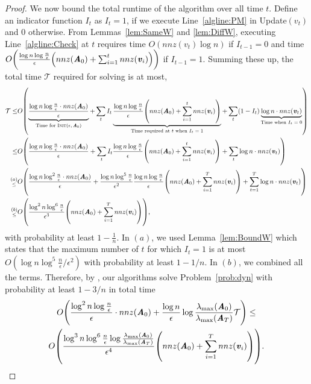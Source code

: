 \documentclass[11pt]{article}
\let\originalleft\left
\let\originalright\right
\renewcommand{\left}{\mathopen{}\mathclose\bgroup\originalleft}
\renewcommand{\right}{\aftergroup\egroup\originalright}
\newcommand\vv{\boldsymbol{\mathit{v}}}
\renewcommand\AA{\boldsymbol{\mathit{A}}}
\begin{document}
\begin{proof}
We now bound the total runtime of the algorithm over all time $t$. Define an indicator function $I_t$ as $I_t = 1$, if we execute Line~\ref{algline:PM} in {\sc Update}$(\vv_t)$ and $0$ otherwise. From Lemmas~\ref{lem:SameW} and \ref{lem:DiffW}, executing Line~\ref{algline:Check} at $t$ requires time $O(nnz(\vv_t)\log n)$ if $I_{t-1} = 0$ and time $O\left(\frac{\log n\log \frac{n}{\epsilon}}{\epsilon}\left(nnz(\AA_0) +\sum_{i=1}^t nnz(\vv_i)\right)\right)$ if $I_{t-1} = 1$. Summing these up, the total time $\mathcal{T}$ required for solving  is at most,
\begin{align*}
\mathcal{T} \leq &  O\left(\underbrace{\frac{\log n\log \frac{n}{\epsilon} \cdot nnz(\AA_0)}{\epsilon}}_{\text{Time for {\sc Init}($\epsilon,\AA_0$)}} + \sum_t I_t \underbrace{\frac{\log n\log \frac{n}{\epsilon}}{\epsilon}\left(nnz(\AA_0) +\sum_{i=1}^t nnz(\vv_i)\right)}_{\text{Time required at $t$ when $I_t = 1$}} + \sum_t (1-I_t)\underbrace{\log n \cdot nnz(\vv_t)}_{\text{Time when $I_t=0$}}\right)\\
\leq & O\left( \frac{\log n\log \frac{n}{\epsilon}\cdot nnz(\AA_0)}{\epsilon}+ \sum_t I_t \frac{\log n\log \frac{n}{\epsilon}}{\epsilon}\left(nnz(\AA_0) +\sum_{i=1}^t nnz(\vv_i)\right) + \sum_t\log n\cdot  nnz(\vv_t)\right)\\
\substack{(a)\\ \leq}& O\left( \frac{\log n\log^2 \frac{n}{\epsilon}\cdot nnz(\AA_0)}{\epsilon}+ \frac{\log n\log^5\frac{n}{\epsilon}}{\epsilon^2}\frac{\log n\log \frac{n}{\epsilon}}{\epsilon} \left(nnz(\AA_0) +\sum_{i=1}^T nnz(\vv_i)\right) + \sum_{t=1}^T\log n\cdot nnz(\vv_t)\right)\\
\substack{(b)\\ \leq} & O\left( \frac{\log^2 n\log^6\frac{n}{\epsilon}}{\epsilon^3} \left(nnz(\AA_0) +\sum_{i=1}^T nnz(\vv_i)\right) \right),
\end{align*}
with probability at least $1-\frac{1}{n}$. In $(a)$, we used Lemma~\ref{lem:BoundW} which states that the maximum number of $t$ for which $I_t=1$ is at most $O(\log n\log^5\frac{n}{\epsilon}/\epsilon^2)$ with probability at least $1-1/n$. In $(b)$, we combined all the terms. Therefore, by , our algorithms solve Problem~\ref{prob:dyn} with probability at least $1-3/n$ in total time
\begin{multline*}
O\left(\frac{\log^2 n\log\frac{n}{\epsilon}}{\epsilon}\cdot nnz(\AA_0) + \frac{\log n}{\epsilon}\log \frac{\lambda_{\max}(\AA_0)}{\lambda_{\max}(\AA_T)}\mathcal{T}\right) \leq \\ O\left(\frac{\log^3 n\log^6 \frac{n}{\epsilon}\log \frac{\lambda_{\max}(\AA_0)}{\lambda_{\max}(\AA_T)}}{\epsilon^4}\left(nnz(\AA_0) +\sum_{i=1}^T nnz(\vv_i)\right)\right).
\end{multline*}
\end{proof}
\end{document}

